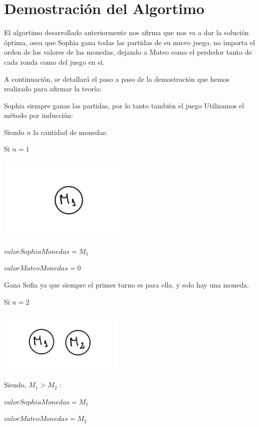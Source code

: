\section{Demostración del Algortimo}

El algortimo desarrollado anteriormente nos afirma que nos va a dar la solución óptima,
osea que Sophia gana todas las partidas de su nuevo juego, no importa el orden de los valores
de las monedas, dejando a Mateo como el perdedor tanto de cada ronda como del juego en si.

\vskip0.5cm

A continuación, se detallará el paso a paso de la demostración que hemos realizado para afirmar la teoría:

\vskip0.5cm

{\large{Sophia siempre ganas las partidas, por lo tanto también el juego}} 
\vskip0.5cm
Utilizamos el método por inducción:
\vskip0.5cm

Siendo $n$ la cantidad de monedas:
\vskip0.5cm

Si $n=1$ 

\includegraphics[width=6.5cm, height=4cm]{images/IMG_1625.jpg}


$valorSophiaMonedas=M_{1}$

$valorMateoMonedas=0$

Gana Sofia ya que siempre el primer turno es para ella, y solo hay una moneda.

\vskip1cm

Si $n=2$

\includegraphics[width=6cm, height=3cm]{images/IMG_1626.jpg}

Siendo, $M_{1}>M_{2}$ : 


$valorSophiaMonedas=M_{1}$

$valorMateoMonedas=M_{2}$

